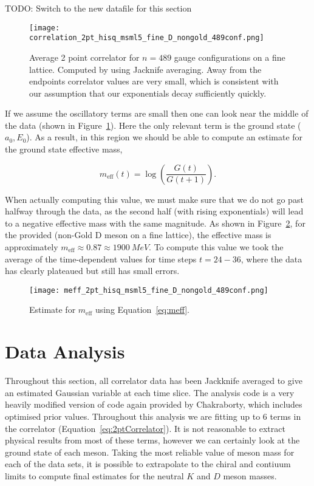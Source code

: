 \documentclass[a4paper,12pt]{article}
\begin{document}
TODO: Switch to the new datafile for this section

\begin{figure}[!h]
    \centering
    \texttt{[image: correlation\_2pt\_hisq\_msml5\_fine\_D\_nongold\_489conf.png]}
    \caption{Average 2 point correlator for $n=489$ gauge configurations on a fine lattice. Computed by using Jacknife averaging. Away from the endpoints correlator values are very small, which is consistent with our assumption that our exponentials decay sufficiently quickly.\label{fig:2ptCorrelator}}
\end{figure}

If we assume the oscillatory terms are small then one can look near the middle of the data (shown in Figure~\ref{fig:2ptCorrelator}). Here the only relevant term is the ground state ($a_0, E_0$). As a result, in this region we should be able to compute an estimate for the ground state effective mass, 

\begin{equation}
    \label{eq:meff}
    m_{\mathrm{eff}}(t) = \log(\frac{G(t)}{G(t+1)}).
\end{equation}

When actually computing this value, we must make sure that we do not go past halfway through the data, as the second half (with rising exponentials) will lead to a negative effective mass with the same magnitude. As shown in Figure~\ref{fig:2ptCorrelatorMeff}, for the provided (non-Gold D meson on a fine lattice), the effective mass is approximately $m_\text{eff} \approx 0.87 \approx \SI{1900}{MeV}$. To compute this value we took the average of the time-dependent values for time steps $t = 24 - 36$, where the data has clearly plateaued but still has small errors.

\begin{figure}[!h]
    \centering
    \texttt{[image: meff\_2pt\_hisq\_msml5\_fine\_D\_nongold\_489conf.png]}
    \caption{Estimate for $m_\text{eff}$ using Equation~\ref{eq:meff}.\label{fig:2ptCorrelatorMeff}} 
\end{figure}

\clearpage
\section{Data Analysis}
Throughout this section, all correlator data has been Jackknife averaged to give an estimated Gaussian variable at each time slice. The analysis code is a very heavily modified version of code again provided by Chakraborty, which includes optimised prior values. Throughout this analysis we are fitting up to 6 terms in the correlator (Equation~\ref{eq:2ptCorrelator}). It is not reasonable to extract physical results from most of these terms, however we can certainly look at the ground state of each meson. Taking the most reliable value of meson mass for each of the data sets, it is possible to extrapolate to the chiral and contiuum limits to compute final estimates for the neutral $K$ and $D$ meson masses.
\end{document}

